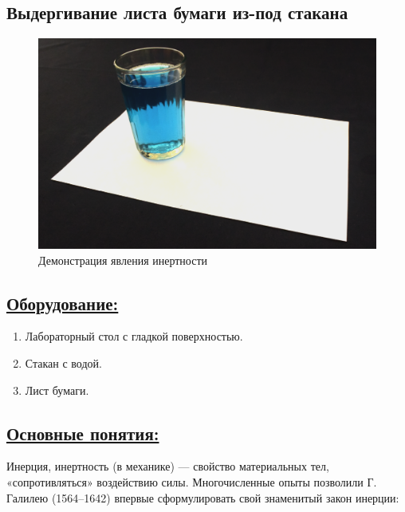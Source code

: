 \documentclass[14pt,a4paper,oneside]{extarticle}	%
\begin{document}

\begin{center}
	\section*{Выдергивание листа бумаги из-под стакана}
\end{center}

\begin{figure}[H] 	
	\centering 	
	\includegraphics[width=0.9\linewidth]{inertia-1.png}
	\caption{Демонстрация явления инертности}
\end{figure}

\subsection*{\underline{Оборудование:}}

\begin{enumerate}
\item Лабораторный стол с гладкой поверхностью.
\item Стакан с водой.
\item Лист бумаги.
\end{enumerate}

\subsection*{\underline{Основные понятия:}}

Инерция, инертность (в механике) — свойство материальных тел, «сопротивляться» воздействию силы.
Многочисленные опыты позволили Г. Галилею (1564–1642) впервые сформулировать свой знаменитый закон инерции:
\end{document}
